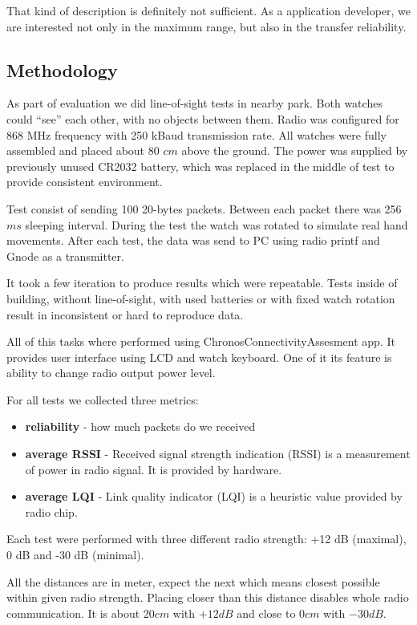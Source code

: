 That kind of description is definitely not sufficient.
As a application developer, we are interested not only in the maximum range, but also in the transfer reliability.


\subsection{Methodology}

As part of evaluation we did line-of-sight tests in nearby park.
Both watches could ``see'' each other, with no objects between them.
Radio was configured for 868 MHz frequency with 250 kBaud transmission rate.
All watches were fully assembled and placed about 80 $ cm $ above the ground.
The power was supplied by previously unused CR2032 battery, which was replaced in the middle of test to provide consistent environment.

Test consist of sending 100 20-bytes packets.
Between each packet there was 256 $ ms $ sleeping interval.
During the test the watch was rotated to simulate real hand movements.
After each test, the data was send to PC using radio printf and Gnode as a transmitter.

It took a few iteration to produce results which were repeatable.
Tests inside of building, without line-of-sight, with used batteries or with fixed watch rotation result in inconsistent or hard to reproduce data.

All of this tasks where performed using ChronosConnectivityAssesment app.
It provides user interface using LCD and watch keyboard.
One of it its feature is ability to change radio output power level.

For all tests we collected three metrics:
\begin{itemize}
  \item \textbf{reliability} - how much packets do we received
  \item \textbf{average RSSI} - Received signal strength indication (RSSI) is a measurement of power in radio signal. It is provided by hardware.
  \item \textbf{average LQI} - Link quality indicator (LQI) is a heuristic value provided by radio chip.
\end{itemize}

Each test were performed with three different radio strength: +12 dB (maximal), 0 dB and -30 dB (minimal).

All the distances are in meter, expect the next which means closest possible within given radio strength.
Placing closer than this distance disables whole radio communication.
It is about $20 cm$ with $+12 dB$ and close to $0 cm$ with $- 30 dB$.

